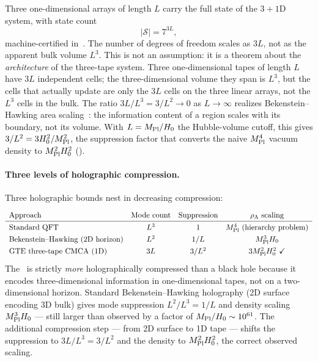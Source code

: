 \documentclass[11pt]{article}
\theoremstyle{remark}
\newcommand{\MPl}{M_{\rm Pl}}
\newcommand{\Hnought}{H_0}
\newcommand{\CMCA}{\text{CMCA}}
\begin{document}
Three one-dimensional arrays of length $L$ carry the full state of the
$3{+}1$D system, with state count
\begin{equation}
  |\mathcal{S}| = 7^{3L},
  \label{eq:statecard}
\end{equation}
machine-certified in~\cite{SpivackThreeTapeCMCA}. The number of degrees of freedom
scales as $3L$, not as the apparent bulk volume $L^3$. This is not an assumption:
it is a theorem about the \emph{architecture} of the three-tape system.  Three
one-dimensional tapes of length $L$ have $3L$ independent cells; the three-dimensional
volume they span is $L^3$, but the cells that actually update are only the $3L$
cells on the three linear arrays, not the $L^3$ cells in the bulk.  The
ratio $3L/L^3 = 3/L^2 \to 0$ as $L \to \infty$ realizes Bekenstein--Hawking area
scaling~\cite{Bekenstein1973}: the information content of a region scales with its
boundary, not its volume. With $L = \MPl/\Hnought$ the Hubble-volume cutoff, this
gives $3/L^2 = 3\Hnought^2/\MPl^2$, the suppression factor that converts the naive
$\MPl^4$ vacuum density to $\MPl^2\Hnought^2$ ().

\paragraph{Three levels of holographic compression.}
Three holographic bounds nest in decreasing compression:
\begin{equation}
  \renewcommand{\arraystretch}{1.3}
  \begin{array}{lccc}
    \text{Approach} & \text{Mode count} & \text{Suppression} & \rho_\Lambda\text{ scaling} \\
    \hline
    \text{Standard QFT} & L^3 & 1 & \MPl^4\ (\text{hierarchy problem}) \\
    \text{Bekenstein--Hawking (2D horizon)} & L^2 & 1/L & \MPl^3\Hnought \\
    \text{GTE three-tape \CMCA\ (1D)} & 3L & 3/L^2 & 3\MPl^2\Hnought^2\ \checkmark \\
  \end{array}
  \label{eq:holo-hierarchy}
\end{equation}
The \CMCA\ is strictly \emph{more} holographically compressed than a black hole
because it encodes three-dimensional information in one-dimensional tapes, not on a
two-dimensional horizon. Standard Bekenstein--Hawking holography (2D surface encoding
3D bulk) gives mode suppression $L^2/L^3 = 1/L$ and density scaling $\MPl^3\Hnought$
--- still larger than observed by a factor of $\MPl/\Hnought \sim 10^{61}$. The
additional compression step --- from 2D surface to 1D tape --- shifts the suppression
to $3L/L^3 = 3/L^2$ and the density to $\MPl^2\Hnought^2$, the correct observed
scaling.
\end{document}
